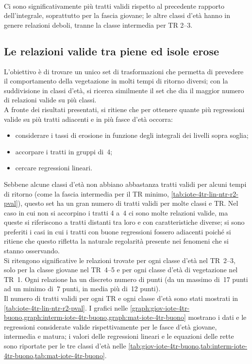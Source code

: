 %
\\
Ci sono significativamente più tratti validi rispetto al precedente rapporto dell'integrale, soprattutto per la fascia giovane; le altre classi d'età hanno in genere relazioni deboli, tranne la classe intermedia per TR \SIrange[range-phrase = {-}, range-units = single]{2}{3}{\mesi}.



\subsection{Le relazioni valide tra piene ed isole erose}
\label{sec:migliori-tratti-piene-erosione}
L'obiettivo è di trovare un unico set di trasformazioni che permetta di prevedere il comportamento della vegetazione in molti tempi di ritorno diversi; con la suddivisione in classi d'età, si ricerca similmente il set che dia il maggior numero di relazioni valide su più classi.
\\
A fronte dei risultati presentati, si ritiene che per ottenere quante più regressioni valide su più tratti adiacenti e in più fasce d'età occorra:
%
\begin{itemize}
	\item considerare i tassi di erosione in funzione degli integrali dei livelli sopra soglia;
	\item accorpare i tratti in gruppi di~4;
	\item cercare regressioni lineari.
\end{itemize}
%
Sebbene alcune classi d'età non abbiano abbastanza tratti validi per alcuni tempi di ritorno (come la fascia intermedia per il TR minimo, \cref{tab:iote-4tr-lin-ntr-r2-pval}), questo set ha un gran numero di tratti validi per molte classi e TR.
Nel caso in cui non si accorpino i tratti 4 a~4 ci sono molte relazioni valide, ma queste si riferiscono a tratti distanti tra loro e con caratteristiche diverse; si sono preferiti i casi in cui i tratti con buone regressioni fossero adiacenti poiché si ritiene che questo rifletta la naturale regolarità presente nei fenomeni che si stanno osservando.
\\
Si ritengono significative le relazioni trovate per ogni classe d'età nel TR~\SIrange[range-phrase = {-}, range-units = single]{2}{3}{\mesi}, solo per la classe giovane nel TR~\SIrange[range-phrase = {-}, range-units = single]{4}{5}{\mesi} e per ogni classe d'età di vegetazione nel TR~\SI{1}{\anno}.
Ogni relazione ha un discreto numero di punti (da un massimo di~17 punti ad un minimo di~7 punti, in media più di~12 punti).
\\
Il numero di tratti validi per ogni TR e ogni classe d'età sono stati mostrati in \cref{tab:iote-4tr-lin-ntr-r2-pval}.
I grafici nelle \cref{graph:giov-iote-4tr-buono,graph:interm-iote-4tr-buono,graph:mat-iote-4tr-buono} mostrano i dati e le regressioni considerate valide rispettivamente per le fasce d'età giovane, intermedia e matura;
i valori delle regressioni lineari e le equazioni delle rette sono riportate per le tre classi d'età nelle \cref{tab:giov-iote-4tr-buono,tab:interm-iote-4tr-buono,tab:mat-iote-4tr-buono}.

